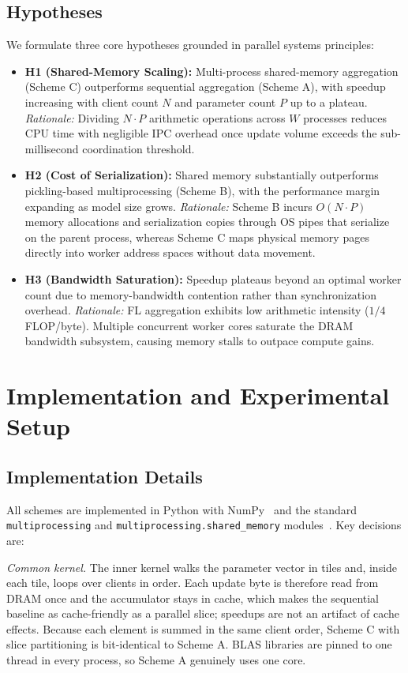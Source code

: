 \documentclass[conference]{IEEEtran}
\begin{document}
\subsection{Hypotheses}
We formulate three core hypotheses grounded in parallel systems principles:
\begin{itemize}
\item \textbf{H1 (Shared-Memory Scaling):} Multi-process shared-memory aggregation (Scheme C) outperforms sequential aggregation (Scheme A), with speedup increasing with client count $N$ and parameter count $P$ up to a plateau.
\emph{Rationale:} Dividing $N\cdot P$ arithmetic operations across $W$ processes reduces CPU time with negligible IPC overhead once update volume exceeds the sub-millisecond coordination threshold.
\item \textbf{H2 (Cost of Serialization):} Shared memory substantially outperforms pickling-based multiprocessing (Scheme B), with the performance margin expanding as model size grows.
\emph{Rationale:} Scheme B incurs $O(N\cdot P)$ memory allocations and serialization copies through OS pipes that serialize on the parent process, whereas Scheme C maps physical memory pages directly into worker address spaces without data movement.
\item \textbf{H3 (Bandwidth Saturation):} Speedup plateaus beyond an optimal worker count due to memory-bandwidth contention rather than synchronization overhead.
\emph{Rationale:} FL aggregation exhibits low arithmetic intensity ($1/4$ FLOP/byte). Multiple concurrent worker cores saturate the DRAM bandwidth subsystem, causing memory stalls to outpace compute gains.
\end{itemize}

\section{Implementation and Experimental Setup}
\subsection{Implementation Details}
All schemes are implemented in Python with NumPy~\cite{numpy} and the standard \texttt{multiprocessing} and \texttt{multiprocessing.shared\_memory} modules~\cite{pyshm}. Key decisions are:

\textit{Common kernel.} The inner kernel walks the parameter vector in tiles and, inside each tile, loops over clients in order. Each update byte is therefore read from DRAM once and the accumulator stays in cache, which makes the sequential baseline as cache-friendly as a parallel slice; speedups are not an artifact of cache effects. Because each element is summed in the same client order, Scheme C with slice partitioning is bit-identical to Scheme A. BLAS libraries are pinned to one thread in every process, so Scheme A genuinely uses one core.
\end{document}
